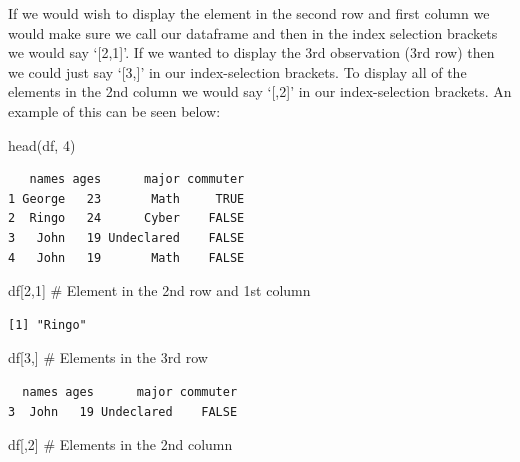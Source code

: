 \documentclass[
  letterpaper,
  DIV=11,
  numbers=noendperiod]{scrreprt}
\newenvironment{Shaded}{\begin{snugshade}}{\end{snugshade}}
\newcommand{\CommentTok}[1]{\textcolor[rgb]{0.37,0.37,0.37}{#1}}
\newcommand{\DecValTok}[1]{\textcolor[rgb]{0.68,0.00,0.00}{#1}}
\newcommand{\FunctionTok}[1]{\textcolor[rgb]{0.28,0.35,0.67}{#1}}
\newcommand{\NormalTok}[1]{\textcolor[rgb]{0.00,0.23,0.31}{#1}}
\begin{document}
If we would wish to display the element in the second row and first
column we would make sure we call our dataframe and then in the index
selection brackets we would say `{[}2,1{]}'. If we wanted to display the
3rd observation (3rd row) then we could just say `{[}3,{]}' in our
index-selection brackets. To display all of the elements in the 2nd
column we would say `{[},2{]}' in our index-selection brackets. An
example of this can be seen below:

\begin{Shaded}
\begin{Highlighting}[]
\FunctionTok{head}\NormalTok{(df, }\DecValTok{4}\NormalTok{)}
\end{Highlighting}
\end{Shaded}

\begin{verbatim}
   names ages      major commuter
1 George   23       Math     TRUE
2  Ringo   24      Cyber    FALSE
3   John   19 Undeclared    FALSE
4   John   19       Math    FALSE
\end{verbatim}

\begin{Shaded}
\begin{Highlighting}[]
\NormalTok{df[}\DecValTok{2}\NormalTok{,}\DecValTok{1}\NormalTok{] }\CommentTok{\# Element in the 2nd row and 1st column}
\end{Highlighting}
\end{Shaded}

\begin{verbatim}
[1] "Ringo"
\end{verbatim}

\begin{Shaded}
\begin{Highlighting}[]
\NormalTok{df[}\DecValTok{3}\NormalTok{,] }\CommentTok{\# Elements in the 3rd row}
\end{Highlighting}
\end{Shaded}

\begin{verbatim}
  names ages      major commuter
3  John   19 Undeclared    FALSE
\end{verbatim}

\begin{Shaded}
\begin{Highlighting}[]
\NormalTok{df[,}\DecValTok{2}\NormalTok{] }\CommentTok{\# Elements in the 2nd column}
\end{Highlighting}
\end{Shaded}
\end{document}
